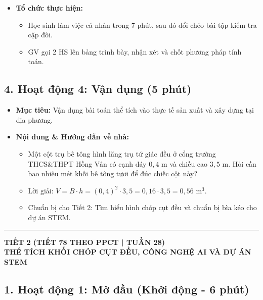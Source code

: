 \documentclass[12pt, a4paper]{article}
\begin{document}
\begin{itemize}[leftmargin=1.2cm]
    \item[d)] \textbf{Tổ chức thực hiện:}
    \begin{itemize}[leftmargin=0.6cm]
        \item Học sinh làm việc cá nhân trong 7 phút, sau đó đổi chéo bài tập kiểm tra cặp đôi.
        \item GV gọi 2 HS lên bảng trình bày, nhận xét và chốt phương pháp tính toán.
    \end{itemize}
\end{itemize}

\subsection*{4. Hoạt động 4: Vận dụng (5 phút)}

\begin{itemize}[leftmargin=1.2cm]
    \item[a)] \textbf{Mục tiêu:} Vận dụng bài toán thể tích vào thực tế sản xuất và xây dựng tại địa phương.
    \item[b)] \textbf{Nội dung & Hướng dẫn về nhà:}
    \begin{itemize}[leftmargin=0.6cm]
        \item Một cột trụ bê tông hình lăng trụ tứ giác đều ở cổng trường THCS\&THPT Hồng Vân có cạnh đáy $0{,}4\text{ m}$ và chiều cao $3{,}5\text{ m}$. Hỏi cần bao nhiêu mét khối bê tông tươi để đúc chiếc cột này?
        \item Lời giải: $V = B \cdot h = (0{,}4)^2 \cdot 3{,}5 = 0{,}16 \cdot 3{,}5 = 0{,}56\text{ m}^3$.
        \item Chuẩn bị cho Tiết 2: Tìm hiểu hình chóp cụt đều và chuẩn bị bìa kéo cho dự án STEM.
    \end{itemize}
\end{itemize}

\vspace{10pt}
\hrule
\vspace{10pt}

\begin{center}
    \textbf{\large TIẾT 2 (TIẾT 78 THEO PPCT | TUẦN 28)}\\[4pt]
    \textbf{\large THỂ TÍCH KHỐI CHÓP CỤT ĐỀU, CÔNG NGHỆ AI VÀ DỰ ÁN STEM}
\end{center}

\subsection*{1. Hoạt động 1: Mở đầu (Khởi động - 6 phút)}
\end{document}
